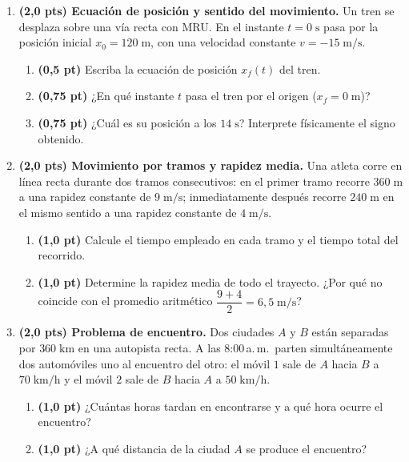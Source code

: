 \documentclass[12pt, letterpaper]{article}
\begin{document}
\begin{enumerate}[leftmargin=*, label=\textbf{\arabic*.}, start=6, itemsep=0.8em]

  \item \textbf{(2,0 pts) Ecuación de posición y sentido del movimiento.}
        Un tren se desplaza sobre una vía recta con MRU. En el instante $t = 0\;\text{s}$ pasa por la posición inicial $x_0 = 120\;\text{m}$, con una velocidad constante $v = -15\;\text{m/s}$.
        \begin{enumerate}[label=\alph*), leftmargin=1.8em, itemsep=0.25em]
          \item \textbf{(0,5 pt)} Escriba la ecuación de posición $x_f(t)$ del tren.
          \item \textbf{(0,75 pt)} ¿En qué instante $t$ pasa el tren por el origen ($x_f = 0\;\text{m}$)?
          \item \textbf{(0,75 pt)} ¿Cuál es su posición a los $14\;\text{s}$? Interprete físicamente el signo obtenido.
        \end{enumerate}
        \vspace{4.0cm}

  \item \textbf{(2,0 pts) Movimiento por tramos y rapidez media.}
        Una atleta corre en línea recta durante dos tramos consecutivos: en el primer tramo recorre $360\;\text{m}$ a una rapidez constante de $9\;\text{m/s}$; inmediatamente después recorre $240\;\text{m}$ en el mismo sentido a una rapidez constante de $4\;\text{m/s}$.
        \begin{enumerate}[label=\alph*), leftmargin=1.8em, itemsep=0.25em]
          \item \textbf{(1,0 pt)} Calcule el tiempo empleado en cada tramo y el tiempo total del recorrido.
          \item \textbf{(1,0 pt)} Determine la rapidez media de todo el trayecto. ¿Por qué no coincide con el promedio aritmético $\dfrac{9 + 4}{2} = 6{,}5\;\text{m/s}$?
        \end{enumerate}
        \vspace{4.0cm}

  \item \textbf{(2,0 pts) Problema de encuentro.}
        Dos ciudades $A$ y $B$ están separadas por $360\;\text{km}$ en una autopista recta. A las 8:00\,a.\,m.\ parten simultáneamente dos automóviles uno al encuentro del otro: el móvil $1$ sale de $A$ hacia $B$ a $70\;\text{km/h}$ y el móvil $2$ sale de $B$ hacia $A$ a $50\;\text{km/h}$.
        \begin{enumerate}[label=\alph*), leftmargin=1.8em, itemsep=0.25em]
          \item \textbf{(1,0 pt)} ¿Cuántas horas tardan en encontrarse y a qué hora ocurre el encuentro?
          \item \textbf{(1,0 pt)} ¿A qué distancia de la ciudad $A$ se produce el encuentro?
        \end{enumerate}
        \vspace{4.0cm}

\end{enumerate}
\end{document}
